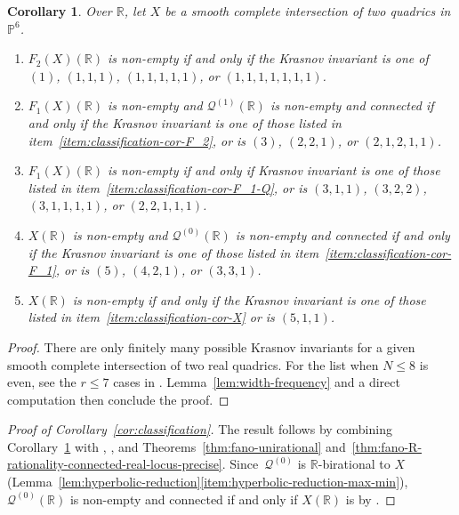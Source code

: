 \documentclass[JEP,XML,SOM,Unicode,NoEqCountersInSection,published]{cedram}
\theoremstyle{plain}
\newtheorem{cor}[thm]{Corollary}
\theoremstyle{definition}
\renewcommand\P{\mathbb{P}}
\newcommand\R{\mathbb{R}}
\begin{document}
\begin{cor}\label{cor:classification-4-fold}
Over $\R$, let $X$ be a smooth complete intersection of two quadrics in $\P^6$.
\begin{enumerate}
\item\label{item:classification-cor-F_2} $F_2(X)(\R)$ is non-empty if and only if the Krasnov invariant is one of $(1)$, $(1,1,1)$, $(1,1,1,1,1)$, or $(1,1,1,1,1,1,1)$.
\item\label{item:classification-cor-F_1-Q} $F_1(X)(\R)$ is non-empty and
$\mathcal{Q}^{(1)}(\R)$ is non-empty and connected
if and only if the Krasnov invariant is one of those listed in item~\ref{item:classification-cor-F_2}, or is $(3)$, $(2,2,1)$, or $(2,1,2,1,1)$.
\item\label{item:classification-cor-F_1}
$F_1(X)(\R)$ is non-empty
if and only if
Krasnov invariant is one of those listed in item~\ref{item:classification-cor-F_1-Q}, or is
$(3,1,1)$, $(3,2,2)$, $(3,1,1,1,1)$, or $(2,2,1,1,1)$.
\item\label{item:classification-cor-X} $X(\R)$ is non-empty and
$\mathcal{Q}^{(0)}(\R)$ is non-empty and connected
if and only if the Krasnov invariant is one of those listed in item~\ref{item:classification-cor-F_1}, or is $(5)$, $(4,2,1)$, or $(3,3,1)$.
\item\label{item:classification-r-point}
$X(\R)$ is non-empty if and only if
the Krasnov invariant is one of those listed in item~\ref{item:classification-cor-X} or is $(5,1,1)$.
\end{enumerate}
\end{cor}

\begin{proof}
There are only finitely many possible Krasnov invariants for a given smooth complete intersection of two real quadrics.
For the list when $N \leq 8$ is even, see the \(r \leq 7\) cases in \cite[\S 4.1, Fig.\,1]{HassettKoll'arTschinkel}.
Lemma~\ref{lem:width-frequency} and a direct computation then conclude the proof.
\end{proof}

\skpt
\begin{proof}[Proof of Corollary~\ref{cor:classification}]
The result follows by combining
Corollary~\ref{cor:classification-4-fold} with \cite[Rem.\,3.28.3]{CTSSD},
\cite[Th.\,1.1]{HassettKoll'arTschinkel}, and
Theorems~\ref{thm:fano-unirational} and~\ref{thm:fano-R-rationality-connected-real-locus-precise}.
Since~$\mathcal{Q}^{(0)}$ is $\R$-birational to $X$ (Lem\-ma~\ref{lem:hyperbolic-reduction}\eqref{item:hyperbolic-reduction-max-min}), $\mathcal{Q}^{(0)}(\R)$ is non-empty and connected if and only if $X(\R)$ is by \cite[Th.\,13.3]{DK81}.
\end{proof}
\end{document}
